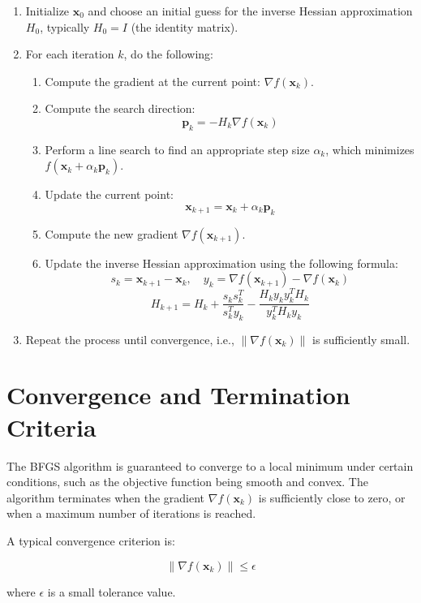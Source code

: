 \documentclass[12pt]{article}
\begin{document}
\begin{enumerate}
   \item Initialize \( \mathbf{x}_0 \) and choose an initial guess for the inverse Hessian approximation \( H_0 \), typically \( H_0 = I \) (the identity matrix).
   \item For each iteration \( k \), do the following:
   \begin{enumerate}
       \item Compute the gradient at the current point: \( \nabla f(\mathbf{x}_k) \).
       \item Compute the search direction:
       \[
       \mathbf{p}_k = -H_k \nabla f(\mathbf{x}_k)
       \]
       \item Perform a line search to find an appropriate step size \( \alpha_k \), which minimizes \( f(\mathbf{x}_k + \alpha_k \mathbf{p}_k) \).
       \item Update the current point:
       \[
       \mathbf{x}_{k+1} = \mathbf{x}_k + \alpha_k \mathbf{p}_k
       \]
       \item Compute the new gradient \( \nabla f(\mathbf{x}_{k+1}) \).
       \item Update the inverse Hessian approximation using the following formula:
       \[
       s_k = \mathbf{x}_{k+1} - \mathbf{x}_k, \quad y_k = \nabla f(\mathbf{x}_{k+1}) - \nabla f(\mathbf{x}_k)
       \]
       \[
       H_{k+1} = H_k + \frac{s_k s_k^T}{s_k^T y_k} - \frac{H_k y_k y_k^T H_k}{y_k^T H_k y_k}
       \]
   \end{enumerate}
   \item Repeat the process until convergence, i.e., \( \|\nabla f(\mathbf{x}_k)\| \) is sufficiently small.
\end{enumerate}

\section{Convergence and Termination Criteria}

The BFGS algorithm is guaranteed to converge to a local minimum under certain conditions, such as the objective function being smooth and convex. The algorithm terminates when the gradient \( \nabla f(\mathbf{x}_k) \) is sufficiently close to zero, or when a maximum number of iterations is reached.

A typical convergence criterion is:

\[
\|\nabla f(\mathbf{x}_k)\| \leq \epsilon
\]

where \( \epsilon \) is a small tolerance value.
\end{document}
